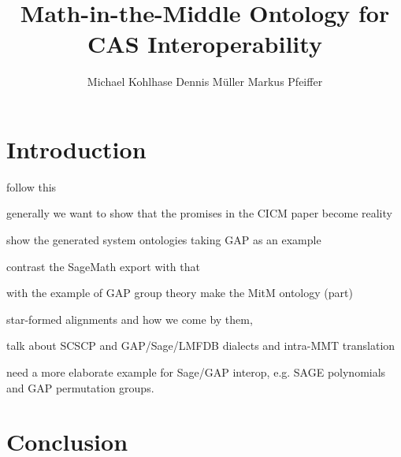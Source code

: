 \documentclass{llncs}
\title{Math-in-the-Middle Ontology for CAS Interoperability}
\author{
Michael Kohlhase\inst{1} 
Dennis M\"uller\inst{1} 
Markus Pfeiffer\inst{2} 
}
\institute{
   FAU Erlangen-N\"urnberg
   \and University of St~Andrews 
}
\begin{document}
\maketitle
\begin{abstract}
\end{abstract}

\section{Introduction}\label{sec:intro}
\begin{todolist}{follow this}
\item generally we want to show that the promises in the CICM paper become reality
\item show the generated system ontologies taking GAP as an example 
\item contrast the SageMath export with that 
\item with the example of GAP group theory make the MitM ontology (part)
\item star-formed alignments and how we come by them, 
\item talk about SCSCP and GAP/Sage/LMFDB dialects and intra-MMT translation
\item need a more elaborate example for Sage/GAP interop, e.g. SAGE polynomials and GAP
  permutation groups. 
\end{todolist}
\section{Conclusion}\label{sec:concl}
\printbibliography
\end{document}
